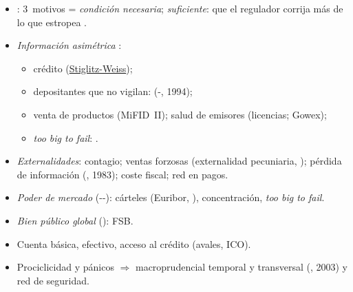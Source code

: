 \documentclass{article}
\begin{document}
\begin{columnas}
\begin{itemize}
\item {}: 3~motivos = \emph{condición necesaria}; \emph{suficiente}: que el regulador corrija más de lo que estropea .
\end{itemize}
\begin{itemize}
\item \emph{Información asimétrica} :
  \begin{itemize}
  \item crédito (\hyperref[rep:I.2]{Stiglitz-Weiss});
  \item depositantes que no vigilan:  (-, 1994);
  \item venta de productos (MiFID~II); salud de emisores (licencias; Gowex);
  \item \emph{too big to fail}: .
  \end{itemize}
\item \emph{Externalidades}: contagio; ventas forzosas (externalidad pecuniaria, ); pérdida de información (, 1983); coste fiscal; red en pagos.
\item \emph{Poder de mercado} (--): cárteles (Euribor, ), concentración, \emph{too big to fail}.
\item \emph{Bien público global} (): FSB.
\end{itemize}
\begin{itemize}
\item Cuenta básica, efectivo, acceso al crédito (avales, ICO).
\end{itemize}
\begin{itemize}
\item Prociclicidad y pánicos $\Rightarrow$ macroprudencial temporal y transversal (, 2003) y red de seguridad.
\end{itemize}


\end{columnas}
\end{document}
